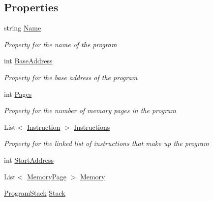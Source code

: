 \subsection*{Properties}
\begin{DoxyCompactItemize}
\item 
string \hyperlink{class_c_p_u___o_s___simulator_1_1_c_p_u_1_1_simulator_program_a29b077a3403773010be9efe912d11b92}{Name}
\begin{DoxyCompactList}\small\item\em Property for the name of the program \end{DoxyCompactList}\item 
int \hyperlink{class_c_p_u___o_s___simulator_1_1_c_p_u_1_1_simulator_program_ad07bee447d47fb07243a4484b5740c21}{Base\+Address}
\begin{DoxyCompactList}\small\item\em Property for the base address of the program \end{DoxyCompactList}\item 
int \hyperlink{class_c_p_u___o_s___simulator_1_1_c_p_u_1_1_simulator_program_aa33b4428956a097dd710948ee51bb5f3}{Pages}
\begin{DoxyCompactList}\small\item\em Property for the number of memory pages in the program \end{DoxyCompactList}\item 
List$<$ \hyperlink{class_c_p_u___o_s___simulator_1_1_c_p_u_1_1_instruction}{Instruction} $>$ \hyperlink{class_c_p_u___o_s___simulator_1_1_c_p_u_1_1_simulator_program_ae64c462081a1806d5f194c271dbb2686}{Instructions}
\begin{DoxyCompactList}\small\item\em Property for the linked list of instructions that make up the program \end{DoxyCompactList}\item 
int \hyperlink{class_c_p_u___o_s___simulator_1_1_c_p_u_1_1_simulator_program_aeeb09200864db79b4a41f35cda644b87}{Start\+Address}
\item 
List$<$ \hyperlink{class_c_p_u___o_s___simulator_1_1_memory_1_1_memory_page}{Memory\+Page} $>$ \hyperlink{class_c_p_u___o_s___simulator_1_1_c_p_u_1_1_simulator_program_ac3f520f751426a1e09f350096f0d2341}{Memory}
\item 
\hyperlink{class_c_p_u___o_s___simulator_1_1_c_p_u_1_1_program_stack}{Program\+Stack} \hyperlink{class_c_p_u___o_s___simulator_1_1_c_p_u_1_1_simulator_program_ac6065e57e8d108a0aefd27840f3bf01c}{Stack}
\end{DoxyCompactItemize}
